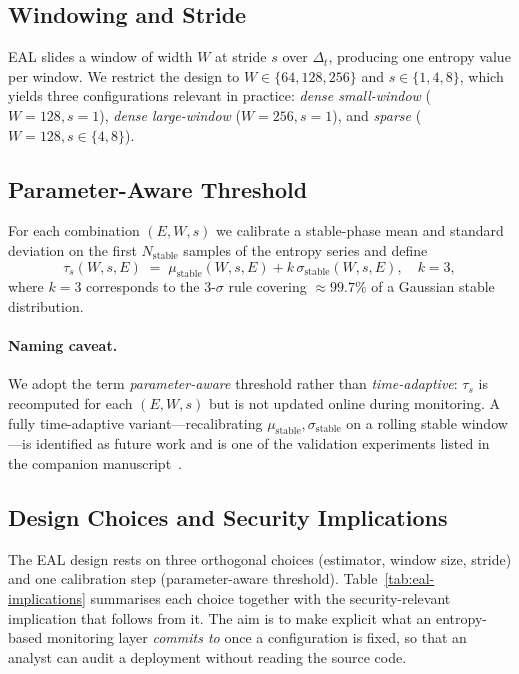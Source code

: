 \documentclass[futureinternet,article,submit,pdftex,moreauthors]{Definitions/mdpi}
\newcommand{\taus}{\ensuremath{\tau_{s}}}
\begin{document}
\subsection{Windowing and Stride}

EAL slides a window of width $W$ at stride $s$ over $\Delta_t$,
producing one entropy value per window. We restrict the design to
$W \in \{64, 128, 256\}$ and $s \in \{1, 4, 8\}$, which yields three
configurations relevant in practice: \emph{dense small-window}
($W=128, s=1$), \emph{dense large-window} ($W=256, s=1$), and
\emph{sparse} ($W=128, s\in\{4,8\}$).

\subsection{Parameter-Aware Threshold}

For each combination $(E, W, s)$ we calibrate a stable-phase mean and
standard deviation on the first $N_{\mathrm{stable}}$ samples of the
entropy series and define
\begin{equation}
\taus(W, s, E) \;=\; \mu_{\mathrm{stable}}(W,s,E)
                     + k\,\sigma_{\mathrm{stable}}(W,s,E),
\quad k = 3,
\label{eq:taus}
\end{equation}
where $k=3$ corresponds to the 3-$\sigma$ rule covering
$\approx 99.7\%$ of a Gaussian stable distribution.

\paragraph{Naming caveat.} We adopt the term \emph{parameter-aware}
threshold rather than \emph{time-adaptive}: $\taus$ is recomputed for
each $(E, W, s)$ but is not updated online during monitoring. A
fully time-adaptive variant---recalibrating
$\mu_{\mathrm{stable}}, \sigma_{\mathrm{stable}}$ on a rolling stable
window---is identified as future work and is one of the validation
experiments listed in the companion manuscript~\cite{paper5}.

\subsection{Design Choices and Security Implications}
\label{sec:eal-implications}

The EAL design rests on three orthogonal choices (estimator, window
size, stride) and one calibration step (parameter-aware threshold).
Table~\ref{tab:eal-implications} summarises each choice together with
the security-relevant implication that follows from it. The aim is to
make explicit what an entropy-based monitoring layer \emph{commits to}
once a configuration is fixed, so that an analyst can audit a deployment
without reading the source code.
\end{document}
